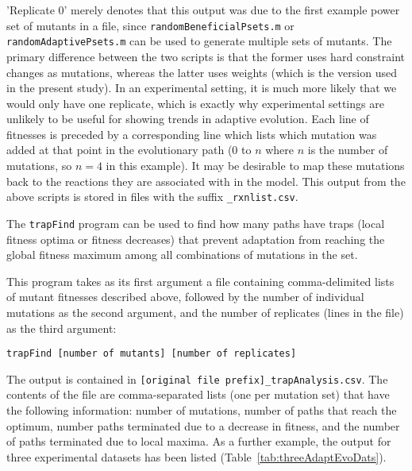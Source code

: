 'Replicate 0' merely denotes that this output was due to the first
example power set of mutants in a file, since
\texttt{randomBeneficialPsets.m} or \texttt{randomAdaptivePsets.m} can
be used to generate multiple sets of mutants. The primary difference
between the two scripts is that the former uses hard constraint
changes as mutations, whereas the latter uses weights (which is the
version used in the present study).  In an experimental setting,
it is much more likely that we would only have one replicate, which is
exactly why experimental settings are unlikely to be useful for
showing trends in adaptive evolution. Each line of fitnesses is
preceded by a corresponding line which lists which mutation was added
at that point in the evolutionary path (0 to $n$ where $n$ is the
number of mutations, so $n = 4$ in this example). It may be desirable 
to map these mutations back to the reactions they are associated with
in the model. This output from the above scripts is stored in files
with the suffix \texttt{\_rxnlist.csv}.

The \texttt{trapFind} program can be used to find how many paths have
traps (local fitness optima or fitness decreases) that prevent
adaptation from reaching the global fitness maximum among all
combinations of mutations in the set.

This program takes as its first argument a file containing comma-delimited 
lists of mutant fitnesses described above, followed by the number of 
individual mutations as the second argument, and the number of replicates 
(lines in the file) as the third argument:

\vspace{1ex}
\noindent
\texttt{trapFind [number of mutants] [number of replicates]}
\label{trapFindCmd}
\vspace{1ex}
 
The output is contained in \texttt{[original file
prefix]\_trapAnalysis.csv}. The contents of the file are
comma-separated lists (one per mutation set) that have the following
information: number of mutations, number of paths that reach the
optimum, number paths terminated due to a decrease in fitness, and
the number of paths terminated due to local maxima. As a further
example, the output for three experimental datasets has been listed
(Table~\ref{tab:threeAdaptEvoDats}).


